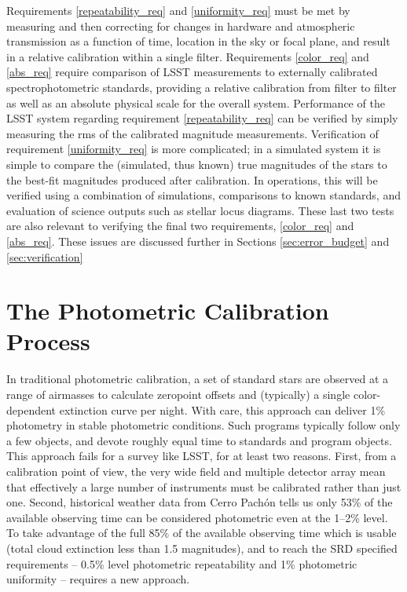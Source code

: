 \documentclass[12pt,preprint]{aastex}
\begin{document}
Requirements \ref{repeatability_req} and \ref{uniformity_req} must be
met by measuring and then correcting for changes in hardware and
atmospheric transmission as a function of time, location in the sky or
focal plane, and result in a relative calibration within a single
filter. Requirements \ref{color_req} and \ref{abs_req} require
comparison of LSST measurements to externally calibrated
spectrophotometric standards, providing a relative calibration from
filter to filter as well as an absolute physical scale for the overall
system.  Performance of the LSST system regarding requirement
\ref{repeatability_req} can be verified by simply measuring the rms of
the calibrated magnitude measurements. Verification of requirement
\ref{uniformity_req} is more complicated; in a simulated system it is
simple to compare the (simulated, thus known) true magnitudes of the
stars to the best-fit magnitudes produced after calibration. 
In operations, this will be verified using a combination of simulations,
comparisons to known standards, and evaluation of science outputs such
as stellar locus diagrams. These last two tests are also relevant to
verifying the final two requirements, \ref{color_req} and
\ref{abs_req}.  These issues are discussed further in Sections 
\ref{sec:error_budget} and \ref{sec:verification}


\section{The Photometric Calibration Process}
\label{sec:calib_overview}

In traditional photometric calibration, a set of standard stars are
observed at a range of airmasses to calculate zeropoint offsets and
(typically) a single color-dependent extinction curve per night. With care,
this approach can deliver 1\% photometry in stable photometric conditions.
Such programs typically follow only a few objects, and devote roughly equal
time to standards and program objects.   This approach fails for a survey like
LSST, for at least two reasons.  First, from a calibration point of view, 
the very wide field and multiple detector array mean that effectively a large number of instruments must be
calibrated rather than just one.
Second, historical weather data from Cerro Pach\'{o}n tells us
only 53\% of the available observing time can be considered
photometric even at the 1--2\% level. To take advantage of the full
85\% of the available observing time which is usable (total cloud
extinction less than 1.5 magnitudes), and to reach the SRD specified
requirements -- 0.5\% level photometric repeatability and 1\%
photometric uniformity -- requires a new approach.
\end{document}
